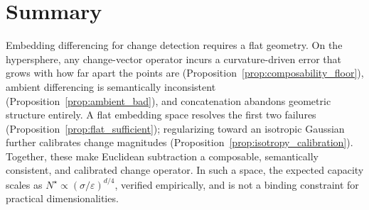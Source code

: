 \documentclass{article}
\begin{document}
\section*{Summary}

Embedding differencing for change detection requires a flat geometry. On the hypersphere, any change-vector operator incurs a curvature-driven error that grows with how far apart the points are (Proposition~\ref{prop:composability_floor}), ambient differencing is semantically inconsistent (Proposition~\ref{prop:ambient_bad}), and concatenation abandons geometric structure entirely. A flat embedding space resolves the first two failures (Proposition~\ref{prop:flat_sufficient}); regularizing toward an isotropic Gaussian further calibrates change magnitudes (Proposition~\ref{prop:isotropy_calibration}). Together, these make Euclidean subtraction a composable, semantically consistent, and calibrated change operator. In such a space, the expected capacity scales as $N^\star \propto (\sigma/\varepsilon)^{d/4}$, verified empirically, and is not a binding constraint for practical dimensionalities.

\FloatBarrier


\end{document}
